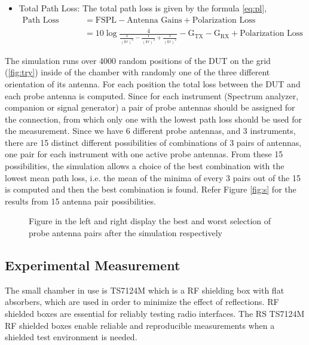 \begin{itemize}
  \item Total Path Loss:
  The total path loss is given by the formula \ref{eq:pl},
  \begin{equation}  \label{eq:pl}
  \begin{split}
  \mbox{Path Loss (k,r)}  & = \mbox{FSPL} - \mbox{Antenna Gains} + \mbox{Polarization Loss} \\
  &= 10 \log\frac{4}{\frac{1}{(kr)^6}-\frac{1}{(kr)^4}+\frac{1}{(kr)^2}} - \mbox{G}_{\mbox{TX}} - \mbox{G}_{\mbox{RX}} + \mbox{Polarization Loss}
 \end{split}
 \end{equation}
   
   \end{itemize}
   
   
The simulation runs over 4000 random positions of the \acs{DUT} on the grid (\ref{fig:try}) inside of the chamber with randomly one of the three different orientation of its antenna. For each position the total loss between the \acs{DUT} and each probe antenna is computed. Since for each instrument (Spectrum analyzer, companion or signal generator) a pair of probe antennas should be assigned for the connection, from which only one with the lowest path loss should be used for the measurement. Since we have 6 different probe antennas, and 3 instruments, there are 15 distinct different possibilities of combinations of 3 pairs of antennas, one pair for each instrument with one active probe antennas. From these 15 possibilities, the simulation allows a choice of the best combination with the lowest mean path loss, i.e. the mean of the minima of every 3 pairs out of the 15 is computed and then the best combination is found. Refer Figure \ref{fig:s} for the results from  15 antenna pair possibilities.

\begin{figure}[H]
\vspace{-3cm}
  \hspace{-1.7cm}
  \hspace{-3cm}
   \vspace{-4.8cm}
\caption{Figure in the left and right display the best and worst selection of probe antenna pairs after the simulation respectively}
\label{fig:simu}
\end{figure}



\subsection{Experimental Measurement} 
The small chamber in use is TS7124M which is a \acs{RF} shielding box with flat absorbers, which are used in order to minimize the effect of reflections. \acs{RF} shielded boxes are essential for reliably testing radio interfaces. The \acs{RS}\textregistered{} TS7124M \acs{RF} shielded boxes enable reliable and reproducible measurements when a shielded test environment is needed. \\

